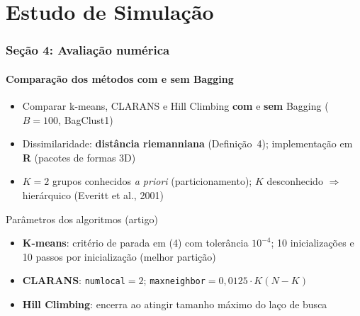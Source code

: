 \documentclass[brazilian,11pt]{beamer}
\begin{document}
\section[Simulação]{Estudo de Simulação}

\begin{frame}[shrink=5]
    \frametitle{Seção 4: Avaliação numérica}
    \framesubtitle{Comparação dos métodos com e sem Bagging}

    \begin{itemize}
        \item Comparar k-means, CLARANS e Hill Climbing \textbf{com} e \textbf{sem} Bagging ($B=100$, BagClust1)
        \item Dissimilaridade: \textbf{distância riemanniana} (Definição~4); implementação em \textbf{R} (pacotes de formas 3D)
        \item $K=2$ grupos conhecidos \textit{a priori} (particionamento); $K$ desconhecido $\Rightarrow$ hierárquico (Everitt et al., 2001)
    \end{itemize}

    \begin{block}{Parâmetros dos algoritmos (artigo)}
        \footnotesize
        \begin{itemize}
            \item \textbf{K-means}: critério de parada em (4) com tolerância $10^{-4}$; 10 inicializações e 10 passos por inicialização (melhor partição)
            \item \textbf{CLARANS}: \texttt{numlocal}$=2$; \texttt{maxneighbor}$=0{,}0125 \cdot K(N-K)$
            \item \textbf{Hill Climbing}: encerra ao atingir tamanho máximo do laço de busca
        \end{itemize}
    \end{block}
\end{frame}
\end{document}
